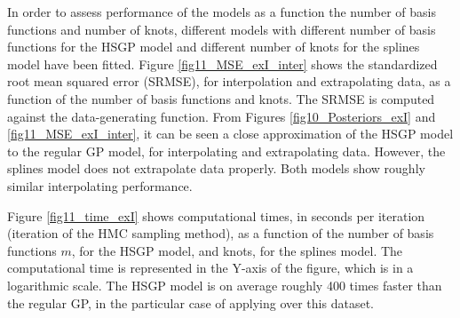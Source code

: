\documentclass[]{interact}
\theoremstyle{plain}%
\theoremstyle{definition}
\theoremstyle{remark}
\begin{document}
In order to assess performance of the models as a function the number of basis functions and number of knots, different models with different number of basis functions for the HSGP model and different number of knots for the splines model have been fitted. Figure \ref{fig11_MSE_exI_inter} shows the standardized root mean squared error (SRMSE), for interpolation and extrapolating data, as a function of the number of basis functions and knots. The SRMSE is computed against the data-generating function. From Figures \ref{fig10_Posteriors_exI} and \ref{fig11_MSE_exI_inter}, it can be seen a close approximation of the HSGP model to the regular GP model, for interpolating and extrapolating data. However, the splines model does not extrapolate data properly. Both models show roughly similar interpolating performance. 

Figure \ref{fig11_time_exI} shows computational times, in seconds per iteration (iteration of the HMC sampling method), as a function of the number of basis functions $m$, for the HSGP model, and knots, for the splines model. The computational time is represented in the Y-axis of the figure, which is in a logarithmic scale. The HSGP model is on average roughly 400 times faster than the regular GP, in the particular case of applying over this dataset.
\end{document}
